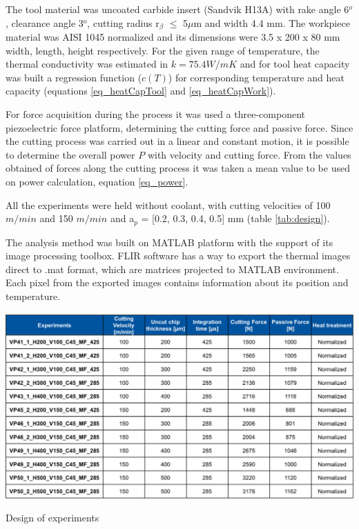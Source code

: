 		The tool material was uncoated carbide insert (Sandvik H13A) with rake angle 6$^{o}$, clearance angle 3$^{o}$, cutting radius r$_{\beta}$ $\le$ 5$\mu$m and width 4.4 mm. The workpiece material was AISI 1045 normalized and its dimensions were 3.5 x 200 x 80 mm width, length, height respectively. For the given range of temperature, the thermal conductivity was estimated in $k = 75.4 W/mK$ and for tool heat capacity was built a regression function ($c(T)$) for corresponding temperature and heat capacity (equations \ref{eq_heatCapTool} and \ref{eq_heatCapWork}).
	
		For force acquisition during the process it was used a three-component piezoelectric force platform, determining the cutting force and passive force. Since the cutting process was carried out in a linear and constant motion, it is possible to determine the overall power $P$ with velocity and cutting force. From the values obtained of forces along the cutting process it was taken a mean value to be used on power calculation, equation \ref{eq_power}. 
	
		All the experiments were held without coolant, with cutting velocities of 100 $m/min$ and 150 $m/min$ and a$_{p}$ = [0.2, 0.3, 0.4, 0.5] mm (table \ref{tab:design}).

		The analysis method was built on MATLAB platform with the support of its image processing toolbox. FLIR software has a way to export the thermal images direct to .mat format, which are matrices projected to MATLAB environment. Each pixel from the exported images contains information about its position and temperature.

		\begin{table}[H]
			\centering
			\captionsetup{justification=centering}
			\includegraphics[scale = 0.6]{Cap3/tabexpset.png}
			\caption{Design of experiments \cite{augspurger2016experimental}}
			\label{tab:design}
		\end{table}

